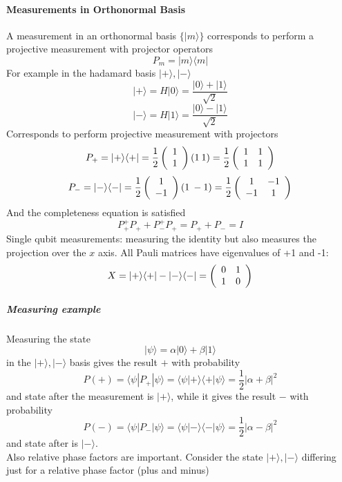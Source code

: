 \documentclass[10pt]{report}
\begin{document}
\paragraph{Measurements in Orthonormal Basis} A measurement in an orthonormal basis $\{|m\rangle\}$ corresponds to perform a projective measurement with projector operators $$P_m=|m\rangle\langle m|$$
For example in the hadamard basis $|+\rangle, |-\rangle$
$$|+\rangle = H|0\rangle = \frac{|0\rangle+|1\rangle}{\sqrt{2}}$$
$$|-\rangle = H|1\rangle = \frac{|0\rangle-|1\rangle}{\sqrt{2}}$$
Corresponds to perform projective measurement with projectors
$$P_+ = |+\rangle\langle +| = \frac{1}{2}\left(\begin{array}{c}
1\\1
\end{array}\right) (1\:1) = \frac{1}{2}\left(\begin{array}{c c}
1&1\\1&1
\end{array}\right)$$
$$P_- = |-\rangle\langle -| = \frac{1}{2}\left(\begin{array}{c}
1\\-1
\end{array}\right) (1\:-1) = \frac{1}{2}\left(\begin{array}{c c}
1&-1\\-1&1
\end{array}\right)$$
And the completeness equation is satisfied $$P_+^+P_+ + P_-^+P_+ = P_+ + P_- = I$$
Single qubit measurements: measuring the identity but also measures the projection over the $x$ axis. All Pauli matrices have eigenvalues of +1 and -1:
$$X = |+\rangle\langle +| - |-\rangle\langle -| = \left(\begin{array}{c c}
0&1\\1&0
\end{array}\right)$$
\subparagraph{Measuring example} Measuring the state $$|\psi\rangle =\alpha|0\rangle + \beta|1\rangle$$
in the $|+\rangle,|-\rangle$ basis gives the result $+$ with probability $$P(+) = \langle\psi|P_+|\psi\rangle = \langle\psi|+\rangle\langle+|\psi\rangle = \frac{1}{2}|\alpha + \beta|^2$$ %
and state after the measurement is $|+\rangle$, while it gives the result $-$ with probability $$P(-) = \langle\psi|P_-|\psi\rangle = \langle\psi|-\rangle\langle-|\psi\rangle = \frac{1}{2}|\alpha - \beta|^2$$ %
and state after is $|-\rangle$.\\
Also relative phase factors are important. Consider the state $|+\rangle,|-\rangle$ differing just for a relative phase factor (plus and minus)
\end{document}
